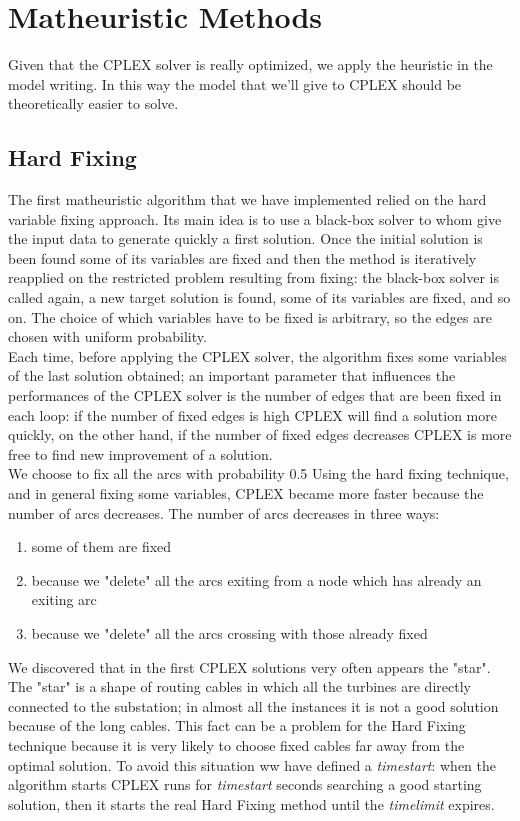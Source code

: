 
\chapter{Matheuristic Methods}
\label{chp:4-Matheuristics}
Given that the \textsc{CPLEX} solver is really optimized, we apply the heuristic in the model writing. In this way the model that we’ll give to \textsc{CPLEX} should be theoretically easier to solve.

\section{Hard Fixing}
The first matheuristic algorithm that we have implemented relied on the hard variable fixing approach. Its main idea is to use a black-box solver to whom give the input data to generate quickly a first solution. Once the initial solution is been found some of its variables are fixed and then the method is iteratively reapplied on the restricted problem resulting from fixing: the black-box solver is called again, a new target solution is found, some of its variables are fixed, and so on. The choice of which variables have to be fixed is arbitrary, so the edges are chosen with uniform probability.\\
Each time, before applying the \textsc{CPLEX} solver, the algorithm fixes some variables of the last solution obtained; an important parameter that influences the performances of the \textsc{CPLEX} solver is the number of edges that are been fixed in each loop: if the number of fixed edges is high \textsc{CPLEX} will find a solution more quickly, on the other hand, if the number of fixed edges decreases \textsc{CPLEX} is more free to find new improvement of a solution. \\
We choose to fix all the arcs with probability 0.5 
Using the hard fixing technique, and in general fixing some variables, \textsc{CPLEX} became more faster because the number of arcs decreases. The number of arcs decreases in three ways: 
\begin{enumerate}
\item some of them are fixed
\item because we "delete" all the arcs exiting from a node which has already an exiting arc
\item because we "delete" all the arcs crossing with those already fixed 
\end{enumerate}
We discovered that in the first \textsc{CPLEX} solutions very often appears the "star". The "star" is a shape of routing cables in which all the turbines are directly connected to the substation; in almost all the instances it is not a good solution because of the long cables. This fact can be a problem for the Hard Fixing technique because it is very likely to choose fixed cables far away from the optimal solution. To avoid this situation ww have defined a \textit{timestart}: when the algorithm starts \textsc{CPLEX} runs for \textit{timestart} seconds searching a good starting solution, then it starts the real Hard Fixing method until the \textit{timelimit} expires. 

